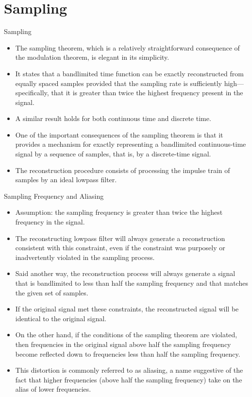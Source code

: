 \section{Sampling}
\begin{frame}{Sampling}
    \begin{itemize}
        \item The sampling theorem, which is a relatively straightforward consequence of
the modulation theorem, is elegant in its simplicity.
        \item It states that a bandlimited time function can be exactly reconstructed from equally spaced samples provided that the sampling rate is sufficiently high---specifically, that it is greater than twice the highest frequency present in the signal.
        \item A similar result holds for both continuous time and discrete time.
        \item One of the important consequences of the sampling theorem is that it provides a mechanism for exactly representing a bandlimited continuous-time signal by a sequence of samples, that is, by a discrete-time signal.
        \item The reconstruction procedure consists of processing the impulse train of samples by an ideal lowpass filter.
    \end{itemize}
\end{frame}


\begin{frame}{Sampling Frequency and Aliasing}
    \begin{itemize}
        \item Assumption: the sampling frequency is greater than twice the highest frequency in the signal.
        \item The reconstructing lowpass filter will always generate a reconstruction consistent with this constraint, even if the constraint was purposely or inadvertently violated in the sampling process.
    \item Said another way, the reconstruction process will always generate a signal that is bandlimited to less than half the sampling frequency
and that matches the given set of samples.
    \item If the original signal met these constraints, the reconstructed signal will be identical to the original signal.
    \item On the other hand, if the conditions of the sampling theorem are violated, then frequencies in the original signal above half the sampling frequency become reflected down to frequencies less than half the sampling frequency.
    \item This distortion is commonly referred to as \alert{aliasing}, a name suggestive of the fact that higher frequencies (above half the sampling frequency) take on the alias of lower frequencies.
    \end{itemize}
\end{frame}

